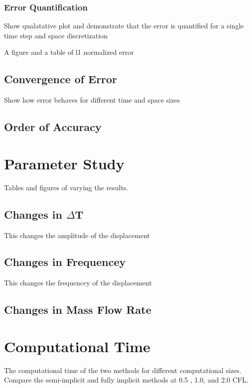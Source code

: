 \documentclass{mc2015}
\begin{document}
\subsubsection{Error Quantification}

Show qualatative plot and demonstrate that the error is quantified 
for a single time step and space discretization

A figure and a table of l1 normalized error

\subsection{Convergence of Error}

Show how error behaves for different time and space sizes

\subsection{Order of Accuracy}

\section{Parameter Study}

Tables and figures of varying the results.

\subsection{Changes in $\Delta$T}

This changes the amplitude of the displacement

\subsection{Changes in Frequencey}

This changes the frequencey of the displacement

\subsection{Changes in Mass Flow Rate}

\section{Computational Time}

The computational time of the two methods for different computational sizes.
Compare the semi-implicit and fully implicit methods at 0.5 , 1.0, and 2.0 CFL. 
\end{document}
